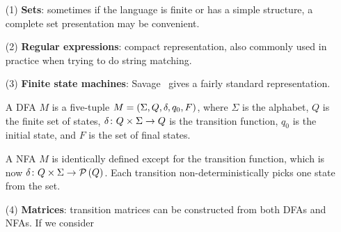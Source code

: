 \begin{enumerate}
  \item[(1)]
    \textbf{Sets}:
    sometimes if the language is finite or has a simple structure,
    a complete set presentation may be convenient.

  \item[(2)]
    \textbf{Regular expressions}:
    compact representation,
    also commonly used in practice when trying to do string matching.

  \item[(3)]
    \textbf{Finite state machines}:
    Savage~\cite{savage1998models} gives a fairly standard representation.

    \begin{definition}[DFA]
      A DFA \(M\) is a five-tuple \(M = \left(\Sigma, Q, \delta, q_0, F\right)\),
      where \(\Sigma\) is the alphabet, \(Q\) is the finite set of states,
      \(\delta \colon Q \times \Sigma \to Q\) is the transition function,
      \(q_0\) is the initial state, and \(F\) is the set of final states.
    \end{definition}

    \begin{definition}[NFA]
      A NFA \(M\) is identically defined except for the
      transition function, which is now
      \(\delta \colon Q \times \Sigma \to \mathcal{P}\left(Q\right)\).
      Each transition non-deterministically picks one state from the set.
    \end{definition}

  \item[(4)]
    \textbf{Matrices}:
    transition matrices can be constructed from both DFAs and NFAs.
    If we consider

\end{enumerate}


